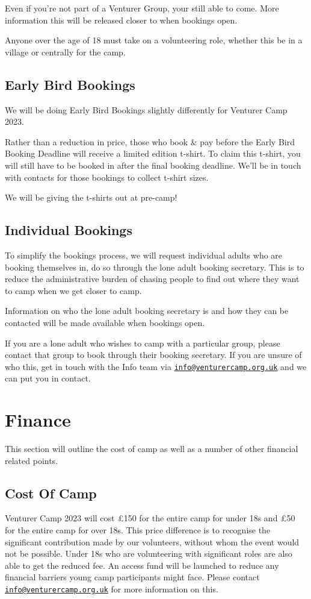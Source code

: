 \documentclass[a4paper, 10pt]{report}
\begin{document}
Even if you're not part of a Venturer Group, your still able to come. More information this will be released closer to when bookings open. 

Anyone over the age of 18 must take on a volunteering role, whether this be in a village or centrally for the camp.

\section{Early Bird Bookings}
We will be doing Early Bird Bookings slightly differently for Venturer Camp 2023.

Rather than a reduction in price, those who book \& pay before the Early Bird Booking Deadline will receive a limited edition t-shirt. To claim this t-shirt, you will still have to be booked in after the final booking deadline. We'll be in touch with contacts for those bookings to collect t-shirt sizes. 

We will be giving the t-shirts out at pre-camp!
\section{Individual Bookings}
To simplify the bookings process, we will request individual adults who are booking themselves in, do so through the lone adult booking secretary. This is to reduce the administrative burden of chasing people to find out where they want to camp when we get closer to camp.

Information on who the lone adult booking secretary is and how they can be contacted will be made available when bookings open.

If you are a lone adult who wishes to camp with a particular group, please contact that group to book through their booking secretary. If you are unsure of who this, get in touch with the Info team via \href{mailto:info@venturercamp.org.uk}{\texttt{info@venturercamp.org.uk}} and we can put you in contact.

\chapter{Finance}
This section will outline the cost of camp as well as a number of other financial related points.
\section{Cost Of Camp}
Venturer Camp 2023 will cost £150 for the entire camp for under 18s and £50 for the entire camp for over 18s. This price difference is to recognise the significant contribution made by our volunteers, without whom the event would not be possible. Under 18s who are volunteering with significant roles are also able to get the reduced fee. An access fund will be launched to reduce any financial barriers young camp participants might face. Please contact \href{mailto:info@venturercamp.org.uk}{\texttt{info@venturercamp.org.uk}} for more information on this.
\end{document}
